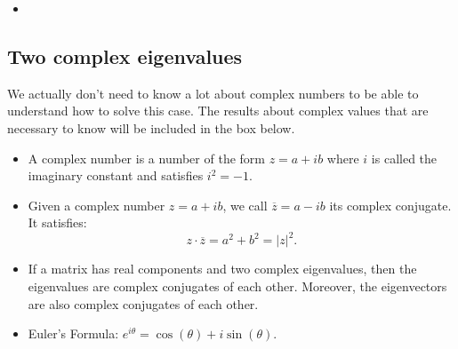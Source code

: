 \begin{video}
	\begin{itemize}
		\item {}
	\end{itemize}
\end{video}





\subsection{Two complex eigenvalues}

We actually don't need to know a lot about complex numbers to be able to understand how to solve this case.
The results about complex values that are necessary to know will be included in the box below.

\begin{definition} \label{EulersFormula}
\begin{itemize}
	\item A complex number is a number of the form $z=a+ib$ where $i$ is called the imaginary constant and satisfies $i^2=-1$.
	\item Given a complex number $z=a+ib$, we call $\overline{z}=a-ib$ its complex conjugate. It satisfies:
	$$ z \cdot \overline{z} = a^2+b^2 = |z|^2.$$

	\item If a matrix has real components and two complex eigenvalues, then the eigenvalues are complex conjugates of each other. Moreover, the eigenvectors are also complex conjugates of each other.
	\item Euler's Formula: $e^{i \theta} = \cos(\theta) + i \sin (\theta)$.
\end{itemize}
\end{definition}




